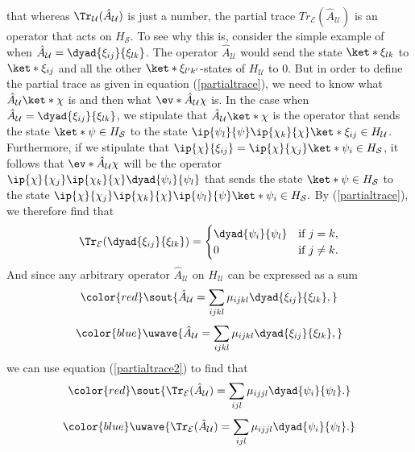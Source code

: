 \documentclass[12pt]{report}
\providecommand{\DIFadd}[1]{{\protect\color{blue}\uwave{#1}}} %
\providecommand{\DIFdel}[1]{{\protect\color{red}\sout{#1}}}                      %
\providecommand{\DIFaddbegin}{} %
\providecommand{\DIFaddend}{} %
\providecommand{\DIFdelbegin}{} %
\providecommand{\DIFdelend}{} %
\begin{document}
% 
    that whereas $\Tr_\mathcal{U}(\hat{A}_\mathcal{U})$ is just a number, the partial trace $Tr_\mathcal{E}(\hat{A}_\mathcal{U})$  is an operator that acts on $H_\mathcal{S}$. To see why this is, consider the simple example of when $\hat{A}_\mathcal{U}=\dyad{\xi_{ij}}{\xi_{lk}}$. The operator $\hat{A}_\mathcal{U}$ would send the state $\ket*{\xi_{lk}}$ to $\ket*{\xi_{ij}}$ and all the other $\ket*{\xi_{l'k'}}$-states of $H_\mathcal{U}$ to $0$. But in order to define the partial trace as given in equation (\ref{partialtrace}), we need to know what $\hat{A}_\mathcal{U}\ket*{\chi}$ is and then what $\ev*{\hat{A}_\mathcal{U}}{\chi}$ is. In the case when $\hat{A}_\mathcal{U}=\dyad{\xi_{ij}}{\xi_{lk}}$, we stipulate that $\hat{A}_\mathcal{U}\ket*{\chi}$ is the operator that sends the state $\ket*{\psi}\in H_\mathcal{S}$ to the state $\ip{\psi_l}{\psi}\ip{\chi_k}{\chi}\ket*{\xi_{ij}}\in H_\mathcal{U}$.  Furthermore, if we stipulate that $\ip{\chi}{\xi_{ij}}=\ip{\chi}{\chi_j}\ket*{\psi_i}\in H_\mathcal{S}$, it follows that $\ev*{\hat{A}_\mathcal{U}}{\chi}$ will be the operator $\ip{\chi}{\chi_j}\ip{\chi_k}{\chi}\dyad{\psi_i}{\psi_l}$ that sends  the state $\ket*{\psi}\in H_\mathcal{S}$ to the state  $\ip{\chi}{\chi_j}\ip{\chi_k}{\chi}\ip{\psi_l}{\psi}\ket*{\psi_i}\in H_\mathcal{S}.$ By (\ref{partialtrace}), we therefore find that
    \begin{equation} \label{partialtrace2}
    \Tr_\mathcal{E}(\dyad{\xi_{ij}}{\xi_{lk}})=
    \begin{cases} \dyad{\psi_i}{\psi_l} & \text{if $j=k$,} \\
    0 & \text{if $j\neq k$}.
    \end{cases}
    \end{equation}
    And since any arbitrary  operator $\hat{A}_\mathcal{U}$ on $H_\mathcal{U}$ can be expressed as a sum 
    \DIFdelbegin \begin{displaymath}\DIFdel{\hat{A}_\mathcal{U}=\sum_{ijkl}\mu_{ijkl}\dyad{\xi_{ij}}{\xi_{lk}},}\end{displaymath}%
\DIFdelend \DIFaddbegin \begin{equation}\DIFadd{\label{Au}
    \hat{A}_\mathcal{U}=\sum_{ijkl}\mu_{ijkl}\dyad{\xi_{ij}}{\xi_{lk}},
    }\end{equation}\DIFaddend 
    we can use equation (\ref{partialtrace2}) to find that 
     \DIFdelbegin \begin{displaymath}\DIFdel{\Tr_\mathcal{E}(\hat{A}_\mathcal{U})=\sum_{ijl}\mu_{ijjl}\dyad{\psi_i}{\psi_l}.}\end{displaymath}%
\DIFdelend \DIFaddbegin \begin{equation}\DIFadd{\label{AuPartialTrace}
     \Tr_\mathcal{E}(\hat{A}_\mathcal{U})=\sum_{ijl}\mu_{ijjl}\dyad{\psi_i}{\psi_l}.
     }\end{equation}\DIFaddend 
\end{document}
